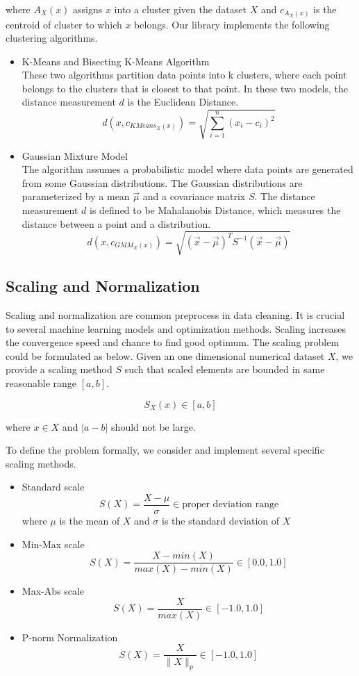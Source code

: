 \documentclass[sigconf]{acmart}
\begin{document}
where $A_X(x)$ assigns $x$ into a cluster given the dataset $X$ and $c_{A_X(x)}$  is the centroid of cluster to which $x$ belongs.
Our library implements the following clustering algorithms. 
\begin{itemize}
	\item{K-Means and Bisecting K-Means Algorithm}\cite{KMeans, biKmeans} \\
		These two algorithms partition data points into k clusters, where each point belongs to the clusters that is closest to that point. In these two models, the distance measurement $d$ is the Euclidean Distance.
		\[ d( x, c_{KMeans_X(x)}) = \sqrt{\sum_{i=1}^n{(x_i - c_i ) ^ 2} } \]
	\item{Gaussian Mixture Model}\cite{GMM} \\
		The algorithm assumes a probabilistic model where data points are generated from some Gaussian distributions. The Gaussian distributions are parameterized by a mean $\vec{\mu}$ and a covariance matrix $S$.
		The distance measurement $d$ is defined to be Mahalanobis Distance, which measures the distance between a point and a distribution.
		\[ d( x, c_{GMM_X(x)}) = \sqrt{(\vec{x}-\vec{\mu})^T S^{-1} (\vec{x}-\vec{\mu}) } \]
\end{itemize}

\subsection{Scaling and Normalization}
Scaling and normalization are common preprocess in data cleaning. It is crucial to several machine learning models and optimization methods. Scaling increases the convergence speed and chance to find good optimum\cite{convex}. The scaling problem could be formulated as below.
Given an one dimensional numerical dataset $X$, we provide a scaling method $S$ such that scaled elements are bounded in same reasonable range $[a, b]$.

\[ S_X(x) \in [a, b]\] 

where $x \in X$ and $|a - b|$ should not be large.

To define the problem formally, we consider and implement several specific scaling methods.
\begin{itemize}
	\item{Standard scale}
		\[ S(X) = \dfrac{X-\mu}{\sigma} \in \text{proper deviation range}\]
		where $\mu$ is the mean of $X$ and $\sigma$ is the standard deviation of $X$
	\item{Min-Max scale}
		\[ S(X) = \dfrac{X-min(X)}{max(X) - min(X)}\in [0.0, 1.0] \]
	\item{Max-Abs scale}
		\[ S(X) = \dfrac{X}{max(X)} \in [-1.0, 1.0] \]
	\item{P-norm Normalization}
		\[ S(X) = \dfrac{X}{\|X\|_{p}} \in [-1.0, 1.0]\]
\end{itemize}
\end{document}
